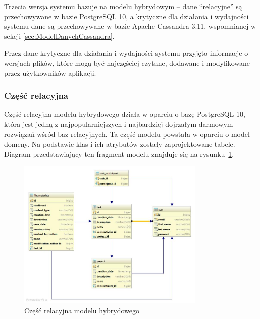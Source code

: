 Trzecia wersja systemu bazuje na modelu hybrydowym -- dane \enquote{relacyjne} są przechowywane w bazie PostgreSQL 10, a krytyczne dla działania i wydajności systemu dane są przechowywane w bazie Apache Cassandra 3.11, wspomnianej w sekcji \ref{sec:ModelDanychCassandra}.

Przez dane krytyczne dla działania i wydajności systemu przyjęto informacje o wersjach plików, które mogą być najczęściej czytane, dodawane i modyfikowane przez użytkowników aplikacji.

\subsubsection{Część relacyjna}

Część relacyjna modelu hybrydowego działa w oparciu o bazę PostgreSQL 10, która jest jedną z najpopularniejszych i najbardziej dojrzałym darmowym rozwiązań wśród baz relacyjnych.
Ta część modelu powstała w oparciu o model domeny.
Na podstawie klas i ich atrybutów zostały zaprojektowane tabele.
Diagram przedstawiający ten fragment modelu znajduje się na rysunku~\ref{fig:postgreModelDiag}.

\begin{figure}[!ht]
\centering
\includegraphics[width=0.8\textwidth]{figures/diagram.jpg}
\caption{Część relacyjna modelu hybrydowego}
\label{fig:postgreModelDiag}
\end{figure}

